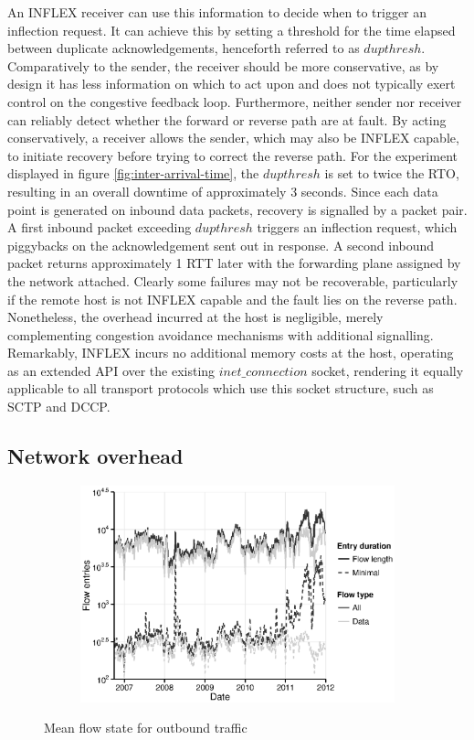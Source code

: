 An INFLEX receiver can use this information to decide when to trigger an inflection request. 
It can achieve this by setting a threshold for the time elapsed between duplicate acknowledgements, henceforth referred to as $dupthresh$.
Comparatively to the sender, the receiver should be more conservative, as by design it has less information on which to act upon and does not typically exert control on the congestive feedback loop.
Furthermore, neither sender nor receiver can reliably detect whether the forward or reverse path are at fault.
By acting conservatively, a receiver allows the sender, which may also be INFLEX capable, to initiate recovery before trying to correct the reverse path.
For the experiment displayed in figure \ref{fig:inter-arrival-time}, the $dupthresh$ is set to twice the \ac{RTO}, resulting in an overall downtime of approximately 3 seconds.
Since each data point is generated on inbound data packets, recovery is signalled by a packet pair.
A first inbound packet exceeding $dupthresh$ triggers an inflection request, which piggybacks on the acknowledgement sent out in response.
A second inbound packet returns approximately 1 RTT later with the forwarding plane assigned by the network attached.
Clearly some failures may not be recoverable, particularly if the remote host is not INFLEX capable and the fault lies on the reverse path.
Nonetheless, the overhead incurred at the host is negligible, merely complementing congestion avoidance mechanisms with additional signalling.
Remarkably, INFLEX incurs no additional memory costs at the host, operating as an extended \ac{API} over the existing $inet\_connection$ socket, rendering it equally applicable to all transport protocols which use this socket structure, such as \ac{SCTP} and \ac{DCCP}.

\subsection{Network overhead}

\begin{figure}
    \begin{subfigure}[b]{1.0\linewidth}
        \centering
        \includegraphics[width=5.0in]{figures/inflex/flow.eps}
    \end{subfigure}%
    \caption{Mean flow state for outbound traffic\label{fig:flow}}
\end{figure}

